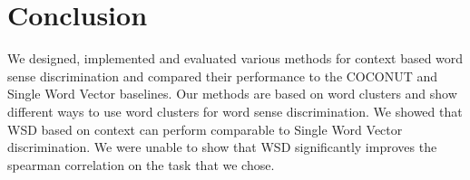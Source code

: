 \documentclass[11pt]{article}
\begin{document}
\section{Conclusion}
We designed, implemented and evaluated various methods for context based word sense discrimination and compared their performance to the COCONUT and Single Word Vector baselines. Our methods are based on word clusters and show different ways to use word clusters for word sense discrimination. We showed that WSD based on context can perform comparable to Single Word Vector discrimination. We were unable to show that WSD significantly improves the spearman correlation on the task that we chose. 



\end{document}
